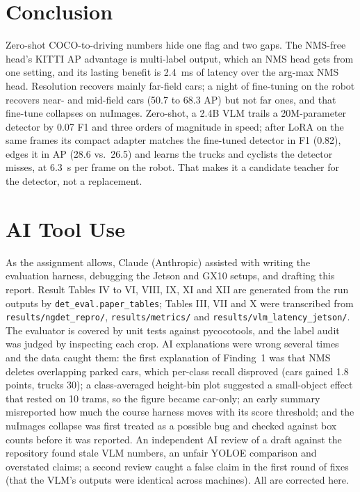 \documentclass[conference]{IEEEtran}
\begin{document}
\section{Conclusion}
Zero-shot COCO-to-driving numbers hide one flag and two gaps. The NMS-free head's KITTI AP advantage is multi-label
output, which an NMS head gets from one setting, and its lasting benefit is 2.4~ms of latency over the arg-max NMS
head. Resolution recovers mainly far-field cars; a night of fine-tuning on the robot recovers near- and mid-field cars
(50.7 to 68.3 AP) but not far ones, and that fine-tune collapses on nuImages. Zero-shot, a 2.4B VLM trails a
20M-parameter detector by 0.07 F1 and three orders of magnitude in speed; after LoRA on the same frames its compact
adapter matches the fine-tuned detector in F1 (0.82), edges it in AP (28.6 vs.\ 26.5) and learns the trucks and
cyclists the detector misses, at 6.3~s per frame on the robot. That makes it a candidate teacher for the detector,
not a replacement.

\section*{AI Tool Use}
As the assignment allows, Claude (Anthropic) assisted with writing the evaluation harness, debugging the Jetson and
GX10 setups, and drafting this report. Result Tables IV to VI, VIII, IX, XI and XII are generated from the run
outputs by \texttt{det\_eval.paper\_tables}; Tables III, VII and X were transcribed from \texttt{results/ngdet\_repro/},
\texttt{results/metrics/} and \texttt{results/vlm\_latency\_jetson/}. The evaluator is covered by unit tests against
pycocotools, and the label audit was judged by inspecting each crop. AI explanations were wrong several times and the
data caught them: the first explanation of Finding~1 was that NMS deletes overlapping parked cars, which per-class
recall disproved (cars gained 1.8 points, trucks 30); a class-averaged height-bin plot suggested a small-object effect
that rested on 10 trams, so the figure became car-only; an early summary misreported how much the course harness
moves with its score threshold; and the nuImages collapse was first treated as a possible bug and checked against box
counts before it was reported. An independent AI review of a draft against the repository found stale VLM numbers,
an unfair YOLOE comparison and overstated claims; a second review caught a false claim in the first round of
fixes (that the VLM's outputs were identical across machines). All are corrected here.
\end{document}
